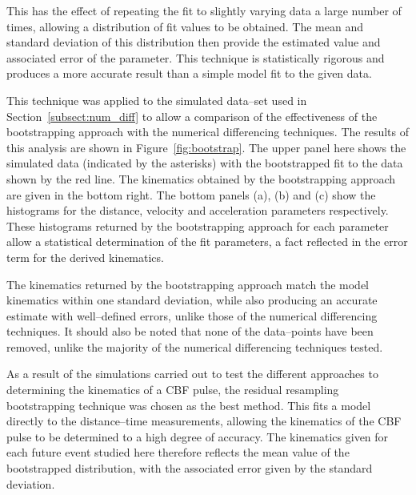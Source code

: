 \documentclass[structabstract]{aa}
\begin{document}
This has the effect of repeating the fit to slightly varying data a large number of times, allowing a distribution of fit values to be obtained. The mean and standard deviation of this distribution then provide the estimated value and associated error of the parameter. This technique is statistically rigorous and produces a more accurate result than a simple model fit to the given data. 

This technique was applied to the simulated data--set used in Section~\ref{subsect:num_diff} to allow a comparison of the effectiveness of the bootstrapping approach with the numerical differencing techniques. The results of this analysis are shown in Figure~\ref{fig:bootstrap}. The upper panel here shows the simulated data (indicated by the asterisks) with the bootstrapped fit to the data shown by the red line. The kinematics obtained by the bootstrapping approach are given in the bottom right. The bottom panels (a), (b) and (c) show the histograms for the distance, velocity and acceleration parameters respectively. These histograms returned by the bootstrapping approach for each parameter allow a statistical determination of the fit parameters, a fact reflected in the error term for the derived kinematics. 

The kinematics returned by the bootstrapping approach match the model kinematics within one standard deviation, while also producing an accurate estimate with well--defined errors, unlike those of the numerical differencing techniques. It should also be noted that none of the data--points have been removed, unlike the majority of the numerical differencing techniques tested. 

As a result of the simulations carried out to test the different approaches to determining the kinematics of a CBF pulse, the residual resampling bootstrapping technique was chosen as the best method. This fits a model directly to the distance--time measurements, allowing the kinematics of the CBF pulse to be determined to a high degree of accuracy. The kinematics given for each future event studied here therefore reflects the mean value of the bootstrapped distribution, with the associated error given by the standard deviation.
\end{document}
